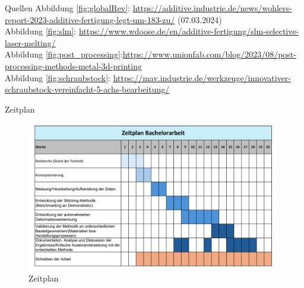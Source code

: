 \documentclass[../slides.tex]{subfiles}
\begin{document}
\begin{frame}{Quellen}
    Abbildung \ref{fig:globalRev}: 
    \url{https://additive.industrie.de/news/wohlers-report-2023-additive-fertigung-legt-um-183-zu/} (07.03.2024)\\

    Abbildung \ref{fig:slm}: \url{https://www.wdoose.de/en/additive-fertigung/slm-selective-laser-melting/}\\
    Abbildung \ref{fig:post_processing}:\url{https://www.unionfab.com/blog/2023/08/post-processing-methods-metal-3d-printing} \\
    Abbildung \ref{fig:schraubstock}: \url{https://mav.industrie.de/werkzeuge/innovativer-schraubstock-vereinfacht-5-achs-bearbeitung/} \\
\end{frame}

\begin{frame}{Zeitplan}
    \begin{figure}[]
        \includegraphics[height=185pt]{img_niklas/zeitplan.png}
        \caption[short]{Zeitplan}
      \end{figure}
\end{frame}
\end{document}
